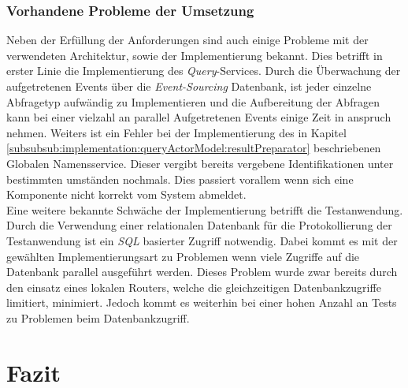 \subsection{Vorhandene Probleme der Umsetzung}
Neben der Erfüllung der Anforderungen sind auch einige Probleme mit der verwendeten Architektur, sowie der Implementierung bekannt. Dies betrifft in erster Linie die Implementierung des \textit{Query}-Services. Durch die Überwachung der aufgetretenen Events über die \textit{Event-Sourcing} Datenbank, ist jeder einzelne Abfragetyp aufwändig zu Implementieren und die Aufbereitung der Abfragen kann bei einer vielzahl an parallel Aufgetretenen Events einige Zeit in anspruch nehmen. Weiters ist ein Fehler bei der Implementierung des in Kapitel \ref{subsubsub:implementation:queryActorModel:resultPreparator} beschriebenen Globalen Namensservice. Dieser vergibt bereits vergebene Identifikationen unter bestimmten umständen nochmals. Dies passiert vorallem wenn sich eine Komponente nicht korrekt vom System abmeldet. \\
Eine weitere bekannte Schwäche der Implementierung betrifft die Testanwendung. Durch die Verwendung einer relationalen Datenbank für die Protokollierung der Testanwendung ist ein \textit{SQL} basierter Zugriff notwendig. Dabei kommt es mit der gewählten Implementierungsart zu Problemen wenn viele Zugriffe auf die Datenbank parallel ausgeführt werden. Dieses Problem wurde zwar bereits durch den einsatz eines lokalen Routers, welche die gleichzeitigen Datenbankzugriffe limitiert, minimiert. Jedoch kommt es weiterhin bei einer hohen Anzahl an Tests zu Problemen beim Datenbankzugriff. 

\chapter{Fazit}
